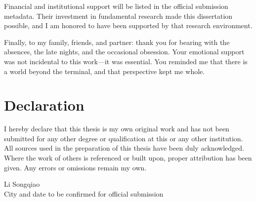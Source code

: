 Financial and institutional support will be listed in the official submission metadata. Their investment in fundamental research made this dissertation possible, and I am honored to have been supported by that research environment.

Finally, to my family, friends, and partner: thank you for bearing with the absences, the late nights, and the occasional obsession. Your emotional support was not incidental to this work---it was essential. You reminded me that there is a world beyond the terminal, and that perspective kept me whole.

\clearpage

\chapter*{Declaration}

I hereby declare that this thesis is my own original work and has not been submitted for any other degree or qualification at this or any other institution. All sources used in the preparation of this thesis have been duly acknowledged. Where the work of others is referenced or built upon, proper attribution has been given. Any errors or omissions remain my own.

\vspace{2cm}
\noindent
Li Songqiao\\
City and date to be confirmed for official submission

\endinput
